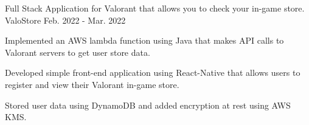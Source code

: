 
\begin{cventries}

    \cventry
    {Full Stack Application for Valorant that allows you to check your in-game store.} %
    {ValoStore} %
    {
        \href{https://github.com/kimdav011/ValoStore}{}
    } %
    {Feb. 2022 - Mar. 2022} %
    {
        \begin{cvitems} %
            \item {Implemented an AWS lambda function using Java that makes API calls to Valorant servers to get user store data.}
            \item {Developed simple front-end application using React-Native that allows users to register and view their Valorant in-game store.}
            \item {Stored user data using DynamoDB and added encryption at rest using AWS KMS.}
        \end{cvitems}
    }

\end{cventries}